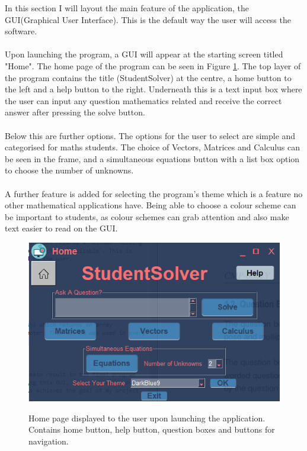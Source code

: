 \documentclass[final]{cmpreport}
\begin{document}
	In this section I will layout the main feature of the application, the GUI(Graphical User Interface). This is the default way the user will access the software.\\
	\\Upon launching the program, a GUI will appear at the starting screen titled "Home". The home page of the program can be seen in Figure \ref{fig:GUI}. The top layer of the program contains the title (StudentSolver) at the centre, a home button to the left and a help button to the right. Underneath this is a text input box where the user can input any question mathematics related and receive the correct answer after pressing the solve button. \\
	\\Below this are further options. The options for the user to select are simple and categorised for maths students. The choice of Vectors, Matrices and Calculus can be seen in the frame, and a simultaneous equations button with a list box option to choose the number of unknowns.\\
	\\A further feature is added for selecting the program's theme which is a feature no other mathematical applications have. Being able to choose a colour scheme can be important to students, as colour schemes can grab attention and also make text easier to read on the GUI. \\

	
	\begin{figure}[H]
		\caption{Home page displayed to the user upon launching the application. Contains home button, help button, question boxes and buttons for navigation.}
		\centering
		\includegraphics[scale=1]{GUI.png}
		\label{fig:GUI}
	\end{figure}
	
\end{document}
